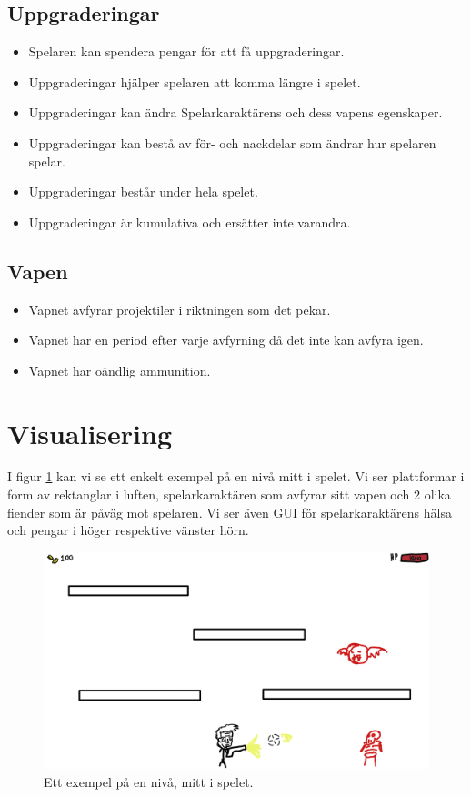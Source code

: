 \documentclass{TDP005mall}
\begin{document}
\subsection{Uppgraderingar}
\begin{itemize}
\item Spelaren kan spendera pengar för att få uppgraderingar.
\item Uppgraderingar hjälper spelaren att komma längre i spelet.
\item Uppgraderingar kan ändra Spelarkaraktärens och dess vapens egenskaper.
\item Uppgraderingar kan bestå av för- och nackdelar som ändrar hur spelaren spelar.
\item Uppgraderingar består under hela spelet.
\item Uppgraderingar är kumulativa och ersätter inte varandra.
\end{itemize}

\subsection{Vapen}
\begin{itemize}
\item Vapnet avfyrar projektiler i riktningen som det pekar.
\item Vapnet har en period efter varje avfyrning då det inte kan avfyra igen.
\item Vapnet har oändlig ammunition.
\end{itemize}

\section{Visualisering}

I figur \ref{fig:1} kan vi se ett enkelt exempel på en nivå mitt i spelet. Vi ser plattformar i form av rektanglar i luften, spelarkaraktären som avfyrar sitt vapen och 2 olika fiender som är påväg mot spelaren. Vi ser även GUI för spelarkaraktärens hälsa och pengar i höger respektive vänster hörn.
\begin{figure}[H]
         \begin{center}
             \includegraphics[width=15cm]{Graphic/main_concept.png}
             \caption{\label{fig:1} Ett exempel på en nivå, mitt i spelet.}
         \end{center}
\end{figure}
\end{document}
